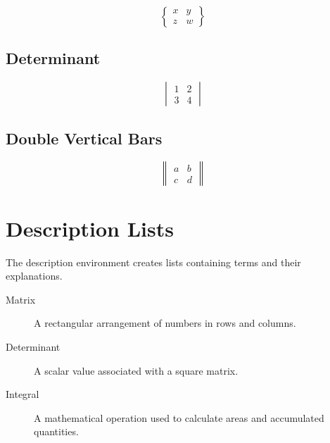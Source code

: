 \documentclass{article}
\begin{document}
\[
\begin{Bmatrix}
x & y \\
z & w
\end{Bmatrix}
\]

\subsection{Determinant}

\[
\begin{vmatrix}
1 & 2 \\
3 & 4
\end{vmatrix}
\]

\subsection{Double Vertical Bars}

\[
\begin{Vmatrix}
a & b \\
c & d
\end{Vmatrix}
\]

\section{Description Lists}

The description environment creates lists
containing terms and their explanations.

\begin{description}
    \item[Matrix] A rectangular arrangement of numbers
    in rows and columns.

    \item[Determinant] A scalar value associated
    with a square matrix.

    \item[Integral] A mathematical operation used
    to calculate areas and accumulated quantities.
\end{description}
\end{document}
